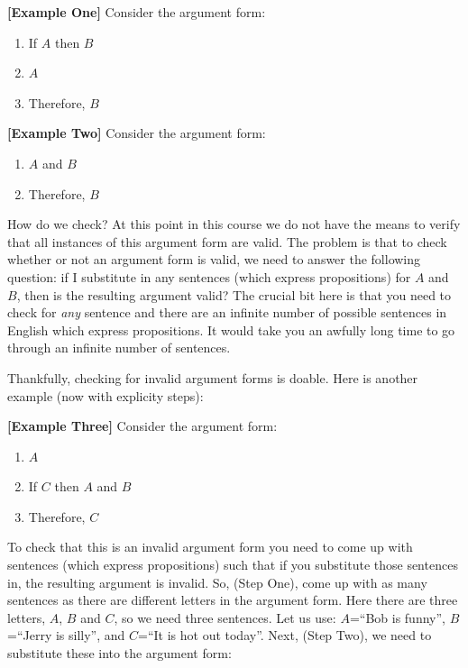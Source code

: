 \documentclass[
]{book}
\providecommand{\tightlist}{%
  \setlength{\itemsep}{0pt}\setlength{\parskip}{0pt}}
\begin{document}
\textbf{{[}Example One{]}} Consider the argument form:

\begin{enumerate}
\def\labelenumi{\arabic{enumi}.}
\tightlist
\item
  If \(A\) then \(B\)
\item
  \(A\)
\item
  Therefore, \(B\)
\end{enumerate}

\textbf{{[}Example Two{]}} Consider the argument form:

\begin{enumerate}
\def\labelenumi{\arabic{enumi}.}
\tightlist
\item
  \(A\) and \(B\)
\item
  Therefore, \(B\)
\end{enumerate}

How do we check? At this point in this course we do not have the means to verify that all instances of this argument form are valid. The problem is that to check whether or not an argument form is valid, we need to answer the following question: if I substitute in any sentences (which express propositions) for \(A\) and \(B\), then is the resulting argument valid? The crucial bit here is that you need to check for \emph{any} sentence and there are an infinite number of possible sentences in English which express propositions. It would take you an awfully long time to go through an infinite number of sentences.

Thankfully, checking for invalid argument forms is doable. Here is another example (now with explicity steps):

\textbf{{[}Example Three{]}} Consider the argument form:

\begin{enumerate}
\def\labelenumi{\arabic{enumi}.}
\tightlist
\item
  \(A\)
\item
  If \(C\) then \(A\) and \(B\)
\item
  Therefore, \(C\)
\end{enumerate}

To check that this is an invalid argument form you need to come up with sentences (which express propositions) such that if you substitute those sentences in, the resulting argument is invalid. So, (Step One), come up with as many sentences as there are different letters in the argument form. Here there are three letters, \(A\), \(B\) and \(C\), so we need three sentences. Let us use: \(A\)=``Bob is funny'', \(B\)=``Jerry is silly'', and \(C\)=``It is hot out today''. Next, (Step Two), we need to substitute these into the argument form:
\end{document}
